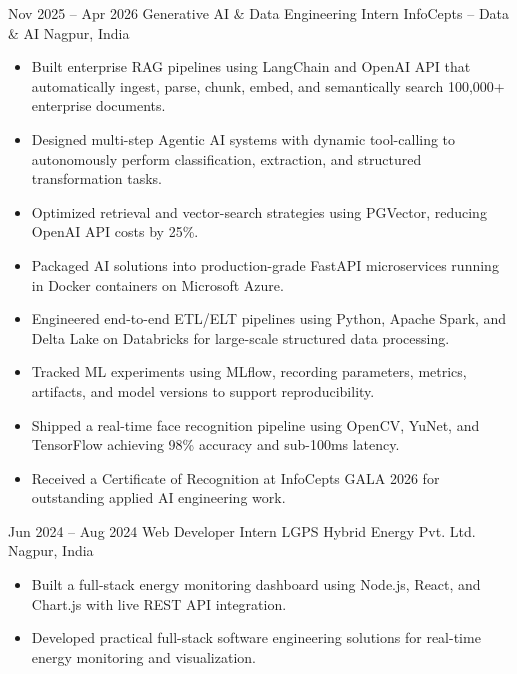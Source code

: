 \documentclass[11pt,a4paper,sans]{moderncv}
\begin{document}
\cventry
{Nov 2025 -- Apr 2026}
{Generative AI \& Data Engineering Intern}
{InfoCepts -- Data \& AI}
{Nagpur, India}
{}
{
\begin{itemize}

\item
Built enterprise RAG pipelines using LangChain and OpenAI API that
automatically ingest, parse, chunk, embed, and semantically search
100,000+ enterprise documents.

\item
Designed multi-step Agentic AI systems with dynamic tool-calling to
autonomously perform classification, extraction, and structured
transformation tasks.

\item
Optimized retrieval and vector-search strategies using PGVector,
reducing OpenAI API costs by 25\%.

\item
Packaged AI solutions into production-grade FastAPI microservices
running in Docker containers on Microsoft Azure.

\item
Engineered end-to-end ETL/ELT pipelines using Python, Apache Spark,
and Delta Lake on Databricks for large-scale structured data processing.

\item
Tracked ML experiments using MLflow, recording parameters, metrics,
artifacts, and model versions to support reproducibility.

\item
Shipped a real-time face recognition pipeline using OpenCV, YuNet,
and TensorFlow achieving 98\% accuracy and sub-100ms latency.

\item
Received a Certificate of Recognition at InfoCepts GALA 2026 for
outstanding applied AI engineering work.

\end{itemize}
}

\cventry
{Jun 2024 -- Aug 2024}
{Web Developer Intern}
{LGPS Hybrid Energy Pvt. Ltd.}
{Nagpur, India}
{}
{
\begin{itemize}

\item
Built a full-stack energy monitoring dashboard using Node.js,
React, and Chart.js with live REST API integration.

\item
Developed practical full-stack software engineering solutions
for real-time energy monitoring and visualization.

\end{itemize}
}
\end{document}
